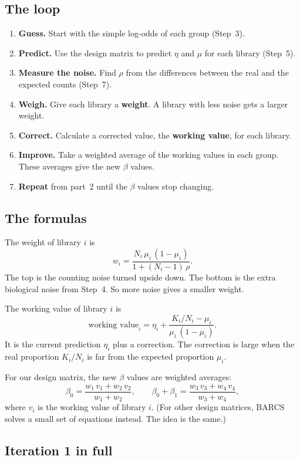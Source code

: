 \documentclass[12pt]{article}
\begin{document}
\subsection{The loop}

\begin{enumerate}
\item \textbf{Guess.} Start with the simple log-odds of each group
  (Step~3).
\item \textbf{Predict.} Use the design matrix to predict $\eta$ and $\mu$
  for each library (Step~5).
\item \textbf{Measure the noise.} Find $\rho$ from the differences between
  the real and the expected counts (Step~7).
\item \textbf{Weigh.} Give each library a \textbf{weight}. A library with
  less noise gets a larger weight.
\item \textbf{Correct.} Calculate a corrected value, the \textbf{working
  value}, for each library.
\item \textbf{Improve.} Take a weighted average of the working values in each
  group. These averages give the new $\beta$ values.
\item \textbf{Repeat} from part~2 until the $\beta$ values stop changing.
\end{enumerate}

\subsection{The formulas}

The weight of library $i$ is
\[
w_i = \frac{N_i\,\mu_i\,(1-\mu_i)}{1 + (N_i - 1)\,\rho}.
\]
The top is the counting noise turned upside down. The bottom is the extra
biological noise from Step~4. So more noise gives a smaller weight.

The working value of library $i$ is
\[
\text{working value}_i = \eta_i + \frac{K_i/N_i - \mu_i}{\mu_i\,(1-\mu_i)}.
\]
It is the current prediction $\eta_i$ plus a correction. The correction is
large when the real proportion $K_i/N_i$ is far from the expected proportion
$\mu_i$.

For our design matrix, the new $\beta$ values are weighted averages:
\[
\beta_0 = \frac{w_1\,v_1 + w_2\,v_2}{w_1 + w_2}, \qquad
\beta_0 + \beta_1 = \frac{w_3\,v_3 + w_4\,v_4}{w_3 + w_4},
\]
where $v_i$ is the working value of library $i$. (For other design matrices,
BARCS solves a small set of equations instead. The idea is the same.)

\subsection{Iteration 1 in full}
\end{document}
